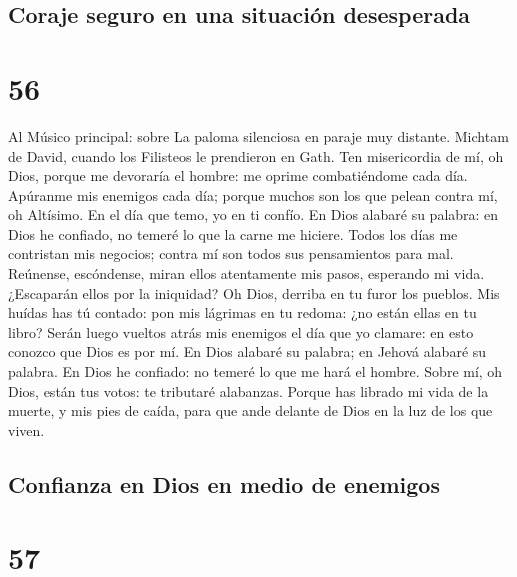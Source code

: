 \hypertarget{coraje-seguro-en-una-situaciuxf3n-desesperada}{%
\subsection{Coraje seguro en una situación
desesperada}\label{coraje-seguro-en-una-situaciuxf3n-desesperada}}

\hypertarget{section-55}{%
\section{56}\label{section-55}}

 Al Músico principal: sobre La paloma silenciosa en paraje
muy distante. Michtam de David, cuando los Filisteos le prendieron en
Gath. Ten misericordia de mí, oh Dios, porque me devoraría el hombre: me
oprime combatiéndome cada día.  Apúranme mis enemigos cada
día; porque muchos son los que pelean contra mí, oh Altísimo.
 En el día que temo, yo en ti confío.  En
Dios alabaré su palabra: en Dios he confiado, no temeré lo que la carne
me hiciere.  Todos los días me contristan mis negocios;
contra mí son todos sus pensamientos para mal.  Reúnense,
escóndense, miran ellos atentamente mis pasos, esperando mi vida.
 ¿Escaparán ellos por la iniquidad? Oh Dios, derriba en tu
furor los pueblos.  Mis huídas has tú contado: pon mis
lágrimas en tu redoma: ¿no están ellas en tu libro?  Serán
luego vueltos atrás mis enemigos el día que yo clamare: en esto conozco
que Dios es por mí.  En Dios alabaré su palabra; en
Jehová alabaré su palabra.  En Dios he confiado: no
temeré lo que me hará el hombre.  Sobre mí, oh Dios,
están tus votos: te tributaré alabanzas.  Porque has
librado mi vida de la muerte, y mis pies de caída, para que ande delante
de Dios en la luz de los que viven.

\hypertarget{confianza-en-dios-en-medio-de-enemigos}{%
\subsection{Confianza en Dios en medio de
enemigos}\label{confianza-en-dios-en-medio-de-enemigos}}

\hypertarget{section-56}{%
\section{57}\label{section-56}}

